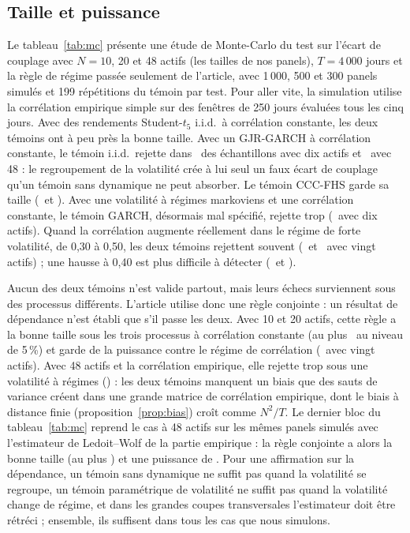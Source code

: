 \documentclass[12pt]{article}
\theoremstyle{definition}
\begin{document}
\begin{doublespace}
\subsection{Taille et puissance}

Le tableau~\ref{tab:mc} présente une étude de Monte-Carlo du test sur
l'écart de couplage avec $N=10$, 20 et 48 actifs (les tailles de nos panels),
$T=4\,000$ jours et la règle de régime passée seulement de l'article, avec
1\,000, 500 et 300 panels simulés et 199 répétitions du témoin par test. Pour
aller vite, la simulation utilise la corrélation empirique simple sur des
fenêtres de 250 jours évaluées tous les cinq jours. Avec des rendements
Student-$t_5$ i.i.d.\ à corrélation constante, les deux témoins ont à peu près
la bonne taille. Avec un GJR-GARCH à corrélation constante, le témoin i.i.d.\
rejette dans \mcGarchIidTen\ des échantillons avec dix actifs et
\mcGarchIidFortyEight\ avec 48 : le regroupement de la volatilité crée à lui
seul un faux écart de couplage qu'un témoin sans dynamique ne peut absorber.
Le témoin CCC-FHS garde sa taille (\mcGarchFhsTen\ et \mcGarchFhsFortyEight).
Avec une volatilité à régimes markoviens et une corrélation constante, le
témoin GARCH, désormais mal spécifié, rejette trop (\mcMsvolFhsTen\ avec dix
actifs). Quand la corrélation augmente réellement dans le régime de forte
volatilité, de 0,30 à 0,50, les deux témoins rejettent souvent
(\mcPowIidTwenty\ et \mcPowFhsTwenty\ avec vingt actifs) ; une hausse à 0,40
est plus difficile à détecter (\mcPowSmallIidTwenty\ et \mcPowSmallFhsTwenty).

Aucun des deux témoins n'est valide partout, mais leurs échecs surviennent
sous des processus différents. L'article utilise donc une règle conjointe : un
résultat de dépendance n'est établi que s'il passe les deux. Avec 10 et 20
actifs, cette règle a la bonne taille sous les trois processus à corrélation
constante (au plus \mcBothWorstSmallN\ au niveau de 5\,\%) et garde de la
puissance contre le régime de corrélation (\mcBothPowTwenty\ avec vingt
actifs). Avec 48 actifs et la corrélation empirique, elle rejette trop sous
une volatilité à régimes (\mcSampleMsvolBothFortyEight) : les deux témoins
manquent un biais que des sauts de variance créent dans une grande matrice de
corrélation empirique, dont le biais à distance finie
(proposition~\ref{prop:bias}) croît comme $N^2/T$. Le dernier bloc du
tableau~\ref{tab:mc} reprend le cas à 48 actifs sur les mêmes panels simulés
avec l'estimateur de Ledoit--Wolf de la partie empirique : la règle conjointe a
alors la bonne taille (au plus \mcLwBothWorst) et une puissance de
\mcLwPow. Pour une affirmation sur la dépendance, un témoin sans dynamique ne
suffit pas quand la volatilité se regroupe, un témoin paramétrique de
volatilité ne suffit pas quand la volatilité change de régime, et dans les
grandes coupes transversales l'estimateur doit être rétréci ; ensemble, ils
suffisent dans tous les cas que nous simulons.


\end{doublespace}
\end{document}
